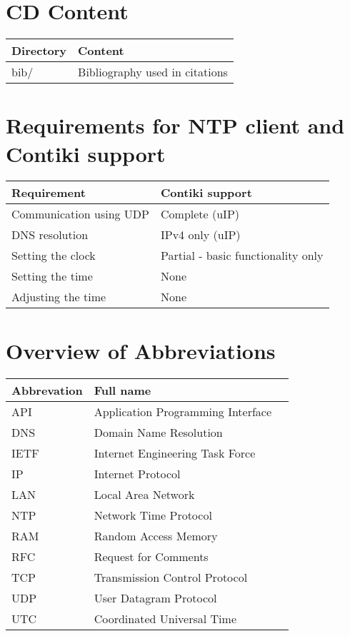 
\chapter{CD Content}
\begin{tabular}{|l|l|}
	\hline
	Directory & Content \\ \hline
	bib/ & Bibliography used in citations \\
	\hline
\end{tabular}

\chapter{Requirements for NTP client and Contiki support}
\begin{tabular}{|l|l|}
	\hline
	Requirement & Contiki support \\ \hline
	Communication using UDP & Complete (uIP) \\
	DNS resolution & IPv4 only (uIP) \\
	Setting the clock & Partial - basic functionality only \\
	Setting the time & None \\
	Adjusting the time & None \\
\end{tabular}

\chapter{Overview of Abbreviations}
\begin{tabular}{|l|l|l|}
	\hline
	Abbrevation & Full name \\ \hline
	API & Application Programming Interface\\
	DNS & Domain Name Resolution \\
	IETF & Internet Engineering Task Force \\
	IP & Internet Protocol \\
	LAN & Local Area Network \\
	NTP & Network Time Protocol \\
	RAM & Random Access Memory \\
	RFC & Request for Comments \\
	TCP & Transmission Control Protocol \\
	UDP & User Datagram Protocol \\
	UTC & Coordinated Universal Time\\
	\hline
\end{tabular}
